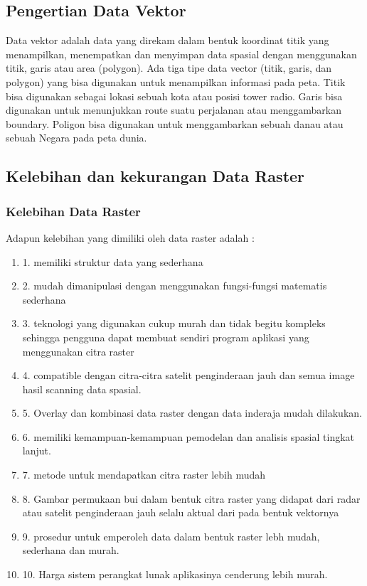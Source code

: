 \subsection{Pengertian Data Vektor}
Data vektor adalah data yang direkam dalam bentuk koordinat titik yang menampilkan, 
menempatkan dan menyimpan data spasial dengan menggunakan titik, 
garis atau area (polygon). Ada tiga tipe data vector (titik, garis, 
dan polygon) yang bisa digunakan untuk menampilkan informasi pada peta. 
Titik bisa digunakan sebagai lokasi sebuah kota atau posisi tower radio. 
Garis bisa digunakan untuk menunjukkan route suatu perjalanan atau menggambarkan boundary. 
Poligon bisa digunakan untuk menggambarkan sebuah danau atau sebuah Negara pada peta dunia.

\subsection{Kelebihan dan kekurangan Data Raster}
\subsubsection{Kelebihan Data Raster}
Adapun kelebihan yang dimiliki oleh data raster adalah :
	\begin{enumerate}
		\item 1. memiliki struktur data yang sederhana
		\item 2. mudah dimanipulasi dengan menggunakan fungsi-fungsi matematis sederhana
		\item 3. teknologi yang digunakan cukup murah dan tidak begitu kompleks sehingga pengguna dapat membuat sendiri program aplikasi yang menggunakan citra raster
		\item 4. compatible dengan citra-citra satelit penginderaan jauh dan semua image hasil scanning data spasial.
		\item 5. Overlay dan kombinasi data raster dengan data inderaja mudah dilakukan.
		\item 6. memiliki kemampuan-kemampuan pemodelan dan analisis  spasial tingkat lanjut.
		\item 7. metode untuk mendapatkan citra raster lebih mudah
		\item 8. Gambar permukaan bui dalam bentuk citra raster yang didapat dari radar atau satelit penginderaan jauh selalu aktual dari pada bentuk vektornya
		\item 9. prosedur untuk emperoleh data dalam bentuk raster lebh mudah, sederhana dan murah.
		\item 10. Harga sistem perangkat lunak aplikasinya cenderung lebih murah.
	\end{enumerate}\cite{irwansyah2013sistem}

